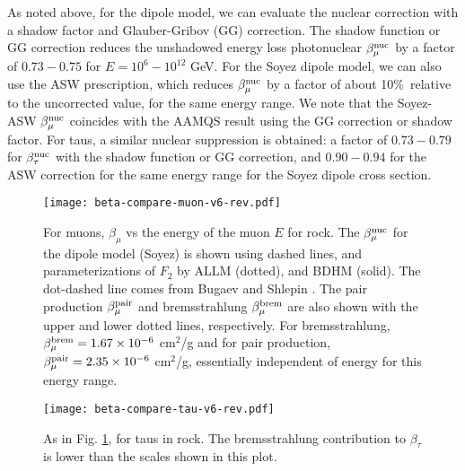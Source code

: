 \documentclass[aps,10pt,twocolumn,tightenlines]{revtex4-1}
\begin{document}
As noted above, for the dipole model, we can evaluate the nuclear correction with a shadow factor and Glauber-Gribov (GG)
correction. 
 The shadow function or GG correction reduces the unshadowed energy loss photonuclear $\beta_\mu^{\rm nuc}$ by a factor of $0.73-0.75$ for $E=10^6-
10^{12}$ GeV. For the Soyez dipole model, we can also use the ASW prescription, which reduces $\beta_\mu^{\rm nuc}$
by a factor of about 10\%\ relative to the uncorrected value, for the same energy range. We note that the Soyez-ASW $\beta_\mu^{\rm nuc}$ coincides with the
AAMQS result using the GG correction or shadow factor. 
For taus, a similar nuclear suppression is obtained: a factor of $0.73-0.79$ for $\beta_\tau^{\rm nuc}$ with the shadow
function or GG correction, and $0.90-0.94$ for the ASW correction for the same energy range for the Soyez dipole cross section.


\begin{figure}[htb]
\centering
	\texttt{[image: beta-compare-muon-v6-rev.pdf]}
	\caption{ For muons, $\beta_\mu$ vs the energy of the muon $E$ for rock. The $\beta_\mu^{\rm nuc}$ for the dipole model (Soyez) is shown using dashed lines,  and parameterizations of $F_2$  by ALLM (dotted), and BDHM (solid). 
The dot-dashed line comes from Bugaev and Shlepin \cite{Bugaev:2002gy}. The pair production $\beta_\mu^{\rm pair}$ and bremsstrahlung $\beta_\mu^{\rm brem}$ are also shown with the upper and lower dotted lines, respectively. For bremsstrahlung, $\beta_\mu^{\rm brem} =1.67\times 10^{-6}$ cm$^2$/g and for pair production,
$\beta_\mu^{\rm pair}=2.35\times 10^{-6}$  cm$^2$/g, essentially independent of energy for this energy range.}
	\label{fig:betamuon}
\end{figure}

\begin{figure}[htb]
\centering
	\texttt{[image: beta-compare-tau-v6-rev.pdf]}
	\caption{As in Fig. \ref{fig:betamuon}, for taus in rock. The bremsstrahlung contribution to $\beta_\tau$ is lower than the scales shown in this plot.}
	\label{fig:betatau}
\end{figure}
\end{document}
